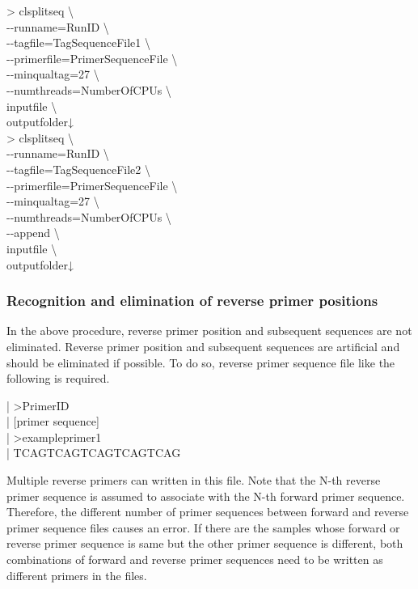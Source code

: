 \documentclass[titlepage,10pt,a4paper,english]{jsbook}
\newenvironment{content}{\begin{shaded}\vspace{-1em}\raggedright\ttfamily\footnotesize\setlength{\baselineskip}{1.4em}}{\end{shaded}\vspace{-1em}}
\newenvironment{cmd}{\begin{oframed}\raggedright\ttfamily\footnotesize\setlength{\baselineskip}{1.4em}}{\end{oframed}\vspace{-1em}}
\begin{document}
\begin{cmd}
{\textgreater} clsplitseq {\textbackslash}\\
{-}{-}runname=RunID {\textbackslash}\\
{-}{-}tagfile=TagSequenceFile1 {\textbackslash}\\
{-}{-}primerfile=PrimerSequenceFile {\textbackslash}\\
{-}{-}minqualtag=27 {\textbackslash}\\
{-}{-}numthreads=NumberOfCPUs {\textbackslash}\\
inputfile {\textbackslash}\\
outputfolder↓\\
{\textgreater} clsplitseq {\textbackslash}\\
{-}{-}runname=RunID {\textbackslash}\\
{-}{-}tagfile=TagSequenceFile2 {\textbackslash}\\
{-}{-}primerfile=PrimerSequenceFile {\textbackslash}\\
{-}{-}minqualtag=27 {\textbackslash}\\
{-}{-}numthreads=NumberOfCPUs {\textbackslash}\\
{-}{-}append {\textbackslash}\\
inputfile {\textbackslash}\\
outputfolder↓
\end{cmd}

\subsubsection{Recognition and elimination of reverse primer positions}
In the above procedure, reverse primer position and subsequent sequences are not eliminated.
Reverse primer position and subsequent sequences are artificial and should be eliminated if possible.
To do so, reverse primer sequence file like the following is required.

\begin{content}
| {\textgreater}PrimerID\\
| [primer sequence]\\
| {\textgreater}exampleprimer1\\
| TCAGTCAGTCAGTCAGTCAG
\end{content}

Multiple reverse primers can written in this file.
Note that the N-th reverse primer sequence is assumed to associate with the N-th forward primer sequence.
Therefore, the different number of primer sequences between forward and reverse primer sequence files causes an error.
If there are the samples whose forward or reverse primer sequence is same but the other primer sequence is different, both combinations of forward and reverse primer sequences need to be written as different primers in the files.
\end{document}
